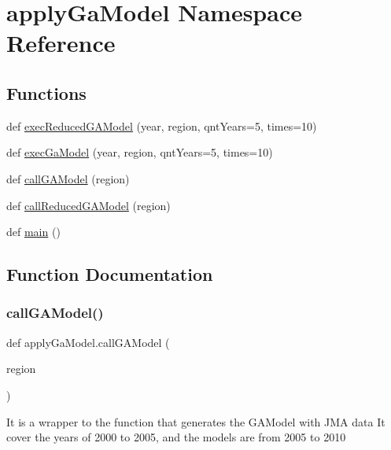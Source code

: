 \hypertarget{namespaceapply_ga_model}{}\section{apply\+Ga\+Model Namespace Reference}
\label{namespaceapply_ga_model}
\subsection*{Functions}
\begin{DoxyCompactItemize}
\item 
def \hyperlink{namespaceapply_ga_model_a46ca0d0c0b7f182095423eabcdd32de9}{exec\+Reduced\+G\+A\+Model} (year, region, qnt\+Years=5, times=10)
\item 
def \hyperlink{namespaceapply_ga_model_ab1a6aa8daf49dc086e44c199e7d470f3}{exec\+Ga\+Model} (year, region, qnt\+Years=5, times=10)
\item 
def \hyperlink{namespaceapply_ga_model_a7f535e4fdd545be7c2ddc5a000c06e89}{call\+G\+A\+Model} (region)
\item 
def \hyperlink{namespaceapply_ga_model_a114bca108bfb9f8c99faec2ad523fff0}{call\+Reduced\+G\+A\+Model} (region)
\item 
def \hyperlink{namespaceapply_ga_model_a2844cb80b8188731fbc00cc0ea48f3cf}{main} ()
\end{DoxyCompactItemize}


\subsection{Function Documentation}
\mbox{\label{namespaceapply_ga_model_a7f535e4fdd545be7c2ddc5a000c06e89}} 
\subsubsection{\texorpdfstring{call\+G\+A\+Model()}{callGAModel()}}
{\footnotesize\ttfamily def apply\+Ga\+Model.\+call\+G\+A\+Model (\begin{DoxyParamCaption}\item[{}]{region }\end{DoxyParamCaption})}

\begin{DoxyVerb}It is a wrapper to the function that generates the GAModel with JMA data
It cover the years of 2000 to 2005, and the models are from 2005 to 2010
\end{DoxyVerb}
 


